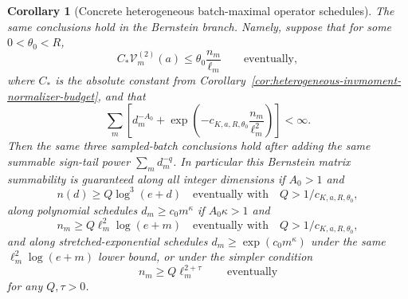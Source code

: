 \documentclass[11pt]{amsart}
\numberwithin{equation}{section}
\newtheorem{corollary}[theorem]{Corollary}
\theoremstyle{definition}
\theoremstyle{remark}
\begin{document}
\begin{corollary}[Concrete heterogeneous batch-maximal operator schedules]
The same conclusions hold in the Bernstein branch.  Namely, suppose that for
some \(0<\theta_0<R\),
\[
  C_*\mathcal V_m^{(2)}(a)\le \theta_0\frac{n_m}{\ell_m}
  \qquad\text{eventually},
\]
where \(C_*\) is the absolute constant from
Corollary~\ref{cor:heterogeneous-invmoment-normalizer-budget}, and that
\[
  \sum_m\left[
    d_m^{-A_0}
    +\exp\left(-c_{K,a,R,\theta_0}\frac{n_m}{\ell_m^2}\right)
  \right]<\infty .
\]
Then the same three sampled-batch conclusions hold after adding the same
summable sign-tail power \(\sum_m d_m^{-q}\).  In particular this Bernstein
matrix summability is guaranteed along all integer dimensions if \(A_0>1\) and
\[
  n(d)\ge Q\log^3(e+d)
  \quad\text{eventually with}\quad Q>1/c_{K,a,R,\theta_0},
\]
along polynomial schedules \(d_m\ge c_0m^\kappa\) if \(A_0\kappa>1\) and
\[
  n_m\ge Q\ell_m^2\log(e+m)
  \quad\text{eventually with}\quad Q>1/c_{K,a,R,\theta_0},
\]
and along stretched-exponential schedules \(d_m\ge\exp(c_0m^\kappa)\) under the
same \(\ell_m^2\log(e+m)\) lower bound, or under the simpler condition
\[
  n_m\ge Q\ell_m^{2+\tau}
  \qquad\text{eventually}
\]
for any \(Q,\tau>0\).
\end{corollary}
\end{document}

